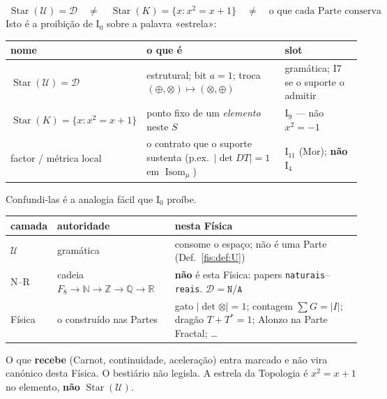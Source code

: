 \documentclass[livro.tex]{subfiles}
\begin{document}
\begin{observacao}\label{fis:obs:tres-canonicos}
\[
\boxed{\;
\operatorname{Star}(\mathcal{U})=\mathcal{D}
\quad\neq\quad
\operatorname{Star}(K)=\{x:x^{2}=x+1\}
\quad\neq\quad
\text{o que cada Parte conserva}
\;}
\]
Isto é a proibição de \(\mathrm{I}_{0}\) sobre a palavra «estrela»:
\begin{center}\small
\begin{tabular}{@{}>{\raggedright\arraybackslash}p{}
                >{\raggedright\arraybackslash}p{}
                >{\raggedright\arraybackslash}p{}@{}}
\toprule
nome & o que é & slot \\
\midrule
\(\operatorname{Star}(\mathcal{U})=\mathcal{D}\)
  & estrutural; bit \(a=1\); troca \((\oplus,\otimes)\mapsto(\otimes,\oplus)\)
  & gramática; I7 se o suporte o admitir \\
\(\operatorname{Star}(K)=\{x:x^{2}=x+1\}\)
  & ponto fixo de um \emph{elemento} neste \(S\)
  & \(\mathrm{I}_{9}\) --- não \(x^{2}=-1\) \\
factor / métrica local
  & o contrato que o suporte sustenta (p.ex.\ \(\lvert\det DT\rvert=1\) em \(\operatorname{Isom}_{\mu}\))
  & \(\mathrm{I}_{11}\) (Mor); \textbf{não} \(\mathrm{I}_{4}\) \\
\bottomrule
\end{tabular}
\end{center}
Confundi-las é a analogia fácil que \(\mathrm{I}_{0}\) proíbe.
\begin{center}\small
\begin{tabular}{@{}llp{}@{}}
\toprule
camada & autoridade & nesta Física \\
\midrule
\(\mathcal{U}\)
  & gramática
  & consome o espaço; não é uma Parte (Def.~\ref{fis:def:U}) \\
N--R
  & cadeia \(F_8\to\mathbb{N}\to\mathbb{Z}\to\mathbb{Q}\to\mathbb{R}\)
  & \textbf{não} é esta Física: papers \texttt{naturais}--\texttt{reais}. \(\mathcal{D}=\texttt{N/A}\) \\
Física
  & o construído nas Partes
  & gato \(\lvert\det\otimes\rvert=1\); contagem \(\sum G=\lvert I\rvert\); dragão \(T+T^{*}=1\); Alonzo na Parte Fractal; \ldots \\
\bottomrule
\end{tabular}
\end{center}
O que \textbf{recebe} (Carnot, continuidade, aceleração) entra marcado e
não vira canónico desta Física. O bestiário não legisla. A estrela da
Topologia é \(x^{2}=x+1\) no elemento, \textbf{não}
\(\operatorname{Star}(\mathcal{U})\).
\end{observacao}
\end{document}
